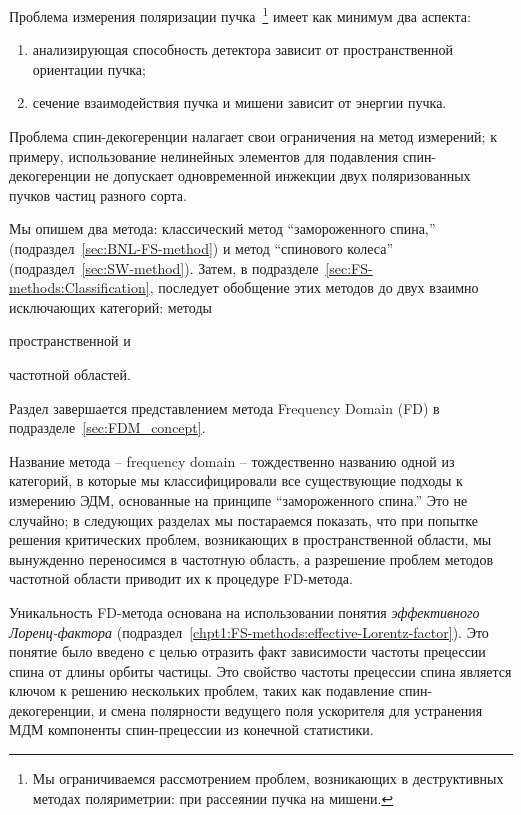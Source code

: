 Проблема измерения поляризации пучка~\footnote{
	Мы ограничиваемся рассмотрением проблем, 
	возникающих в деструктивных методах поляриметрии: при рассеянии пучка на мишени.}  
имеет как минимум два аспекта:
\begin{enumerate}[(1)]
	\item анализирующая способность детектора зависит от пространственной ориентации пучка;
	\item сечение взаимодействия пучка и мишени зависит от энергии пучка.
\end{enumerate}

Проблема спин-декогеренции налагает свои ограничения на метод измерений; к примеру, 
использование нелинейных элементов для подавления 
спин-декогеренции не допускает одновременной инжекции двух поляризованных пучков 
частиц разного сорта. 

Мы опишем два метода: классический метод ``замороженного спина,'' (подраздел~\ref{sec:BNL-FS-method}) 
и метод ``спинового колеса'' (подраздел~\ref{sec:SW-method}). 
Затем, в подразделе~\ref{sec:FS-methods:Classification}, последует обобщение этих методов 
до двух взаимно исключающих категорий: методы
\begin{enumerate*}
	\item пространственной и
	\item частотной областей.
\end{enumerate*}
Раздел завершается представлением метода Frequency Domain (FD) в подразделе~\ref{sec:FDM_concept}. 

Название метода -- frequency domain -- тождественно названию одной из категорий, 
в которые мы классифицировали все существующие подходы к измерению ЭДМ, основанные на 
принципе ``замороженного спина.''
Это не случайно; в следующих разделах мы постараемся показать, что при попытке  решения 
критических проблем, возникающих в пространственной области, мы вынужденно переносимся 
в частотную область, а разрешение проблем методов частотной области приводит их к процедуре FD-метода.

Уникальность FD-метода основана на использовании понятия \emph{эффективного Лоренц-фактора}
 (подраздел~\ref{chpt1:FS-methods:effective-Lorentz-factor}). Это понятие было введено с целью отразить
 факт зависимости частоты прецессии спина от длины орбиты частицы. Это свойство частоты прецессии спина
 является ключом к решению нескольких проблем, таких как подавление спин-декогеренции, 
 и смена полярности ведущего поля ускорителя для устранения МДМ компоненты спин-прецессии из 
 конечной статистики.

